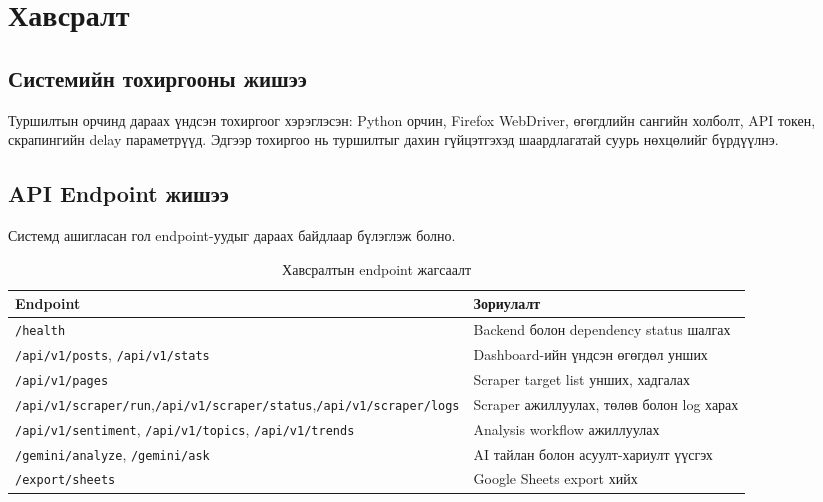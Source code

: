 \documentclass[
12pt,
oneside,
english,
onehalfspacing,
nolistspacing,
headsepline,
]{MUST-Thesis}
\begin{document}
\chapter{Хавсралт}

\section{Системийн тохиргооны жишээ}

Туршилтын орчинд дараах үндсэн тохиргоог хэрэглэсэн: Python орчин, Firefox WebDriver, өгөгдлийн сангийн холболт, API токен, скрапингийн delay параметрүүд. Эдгээр тохиргоо нь туршилтыг дахин гүйцэтгэхэд шаардлагатай суурь нөхцөлийг бүрдүүлнэ.


\section{API Endpoint жишээ}

Системд ашигласан гол endpoint-уудыг дараах байдлаар бүлэглэж болно.

\begin{table}[H]
\centering
\caption{Хавсралтын endpoint жагсаалт}
\small
\renewcommand{\arraystretch}{1.2}
\begin{adjustbox}{max width=\textwidth}
\begin{tabular}{|L{4.2cm}|L{9.2cm}|}
\hline
{}\textbf{Endpoint} & \textbf{Зориулалт} \\ \hline
\texttt{/health} & Backend болон dependency status шалгах \\ \hline
\texttt{/api/v1/posts}, \texttt{/api/v1/stats} & Dashboard-ийн үндсэн өгөгдөл унших \\ \hline
\texttt{/api/v1/pages} & Scraper target list унших, хадгалах \\ \hline
\texttt{/api/v1/scraper/run},\newline\texttt{/api/v1/scraper/}\newline\texttt{status},\newline\texttt{/api/v1/scraper/logs} & Scraper ажиллуулах, төлөв болон log харах \\ \hline
\texttt{/api/v1/sentiment}, \texttt{/api/v1/topics}, \texttt{/api/v1/trends} & Analysis workflow ажиллуулах \\ \hline
\texttt{/gemini/analyze}, \texttt{/gemini/ask} & AI тайлан болон асуулт-хариулт үүсгэх \\ \hline
\texttt{/export/sheets} & Google Sheets export хийх \\ \hline
\end{tabular}
\end{adjustbox}
\normalsize
\end{table}
\end{document}
